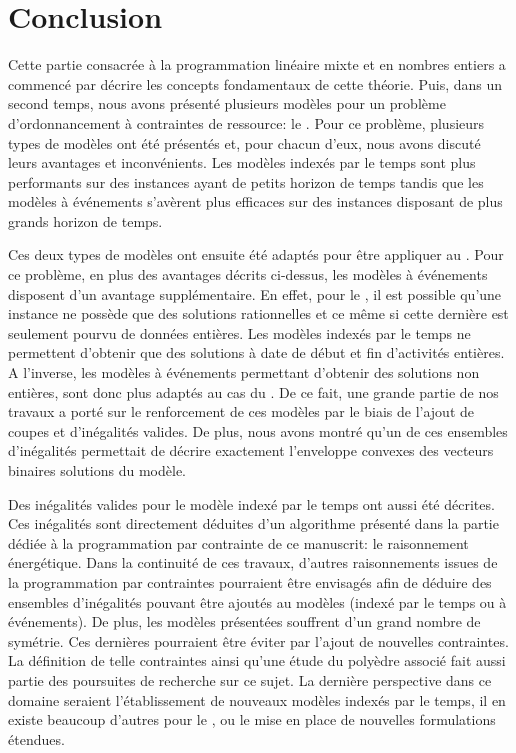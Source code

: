 \chapter*{Conclusion}

Cette partie consacrée à la programmation linéaire mixte et en nombres
entiers a commencé par décrire les concepts fondamentaux de cette
théorie. Puis, dans un second temps, nous avons présenté plusieurs
modèles pour un problème d'ordonnancement à contraintes de ressource:
le \RCPSP. Pour ce problème, plusieurs types de modèles ont été
présentés et, pour chacun d'eux, nous avons discuté leurs avantages et
inconvénients. Les modèles indexés par le temps sont plus performants
sur des instances ayant de petits horizon de temps tandis que les
modèles à événements s'avèrent plus efficaces sur des instances
disposant de plus grands horizon de temps. 

Ces deux types de modèles ont ensuite été adaptés pour être appliquer
au \CECSP. Pour ce problème, en plus des avantages décrits ci-dessus,
les modèles à événements disposent d'un avantage supplémentaire. En
effet, pour le \CECSP, il est possible qu'une instance ne possède que
des solutions rationnelles et ce même si cette dernière est seulement
pourvu de données entières. Les modèles indexés par le temps ne
permettent d'obtenir que des solutions à date de début et fin
d'activités entières. A l'inverse, les modèles à événements permettant
d'obtenir des solutions non entières, sont donc plus adaptés au cas du
\CECSP. De ce fait, une grande partie de nos travaux a porté sur le
renforcement de ces modèles par le biais de l'ajout de coupes et
d'inégalités valides. De plus, nous avons montré qu'un de ces
ensembles d'inégalités permettait de décrire exactement l'enveloppe
convexes des vecteurs binaires solutions du modèle. 

Des inégalités valides pour le modèle indexé par le temps ont aussi
été décrites. Ces inégalités sont directement déduites d'un algorithme
présenté dans la partie dédiée à la programmation par contrainte de
ce manuscrit: le raisonnement énergétique. Dans la continuité de ces
travaux, d'autres raisonnements issues de la programmation par
contraintes pourraient être envisagés afin de déduire des ensembles
d'inégalités pouvant être ajoutés au modèles (indexé par le temps ou à
événements). De plus, les modèles présentées souffrent d'un grand
nombre de symétrie. Ces dernières pourraient être éviter par l'ajout
de nouvelles contraintes. La définition de telle contraintes ainsi
qu'une étude du polyèdre associé fait aussi partie des poursuites de
recherche sur ce sujet. La dernière perspective dans ce domaine
seraient l'établissement de nouveaux modèles indexés par le temps, il
en existe beaucoup d'autres pour le \RCPSP, ou le mise en place de
nouvelles formulations étendues.
